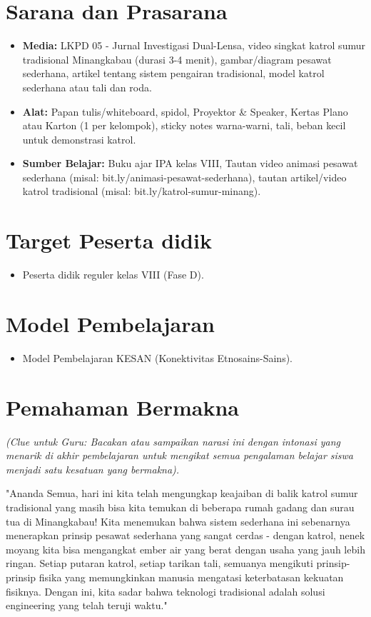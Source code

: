 \documentclass[a4paper,12pt]{article}
\begin{document}
\section{Sarana dan Prasarana}

\begin{itemize}
\item \textbf{Media:} LKPD 05 - Jurnal Investigasi Dual-Lensa, video singkat katrol sumur tradisional Minangkabau (durasi 3-4 menit), gambar/diagram pesawat sederhana, artikel tentang sistem pengairan tradisional, model katrol sederhana atau tali dan roda.
\item \textbf{Alat:} Papan tulis/whiteboard, spidol, Proyektor \& Speaker, Kertas Plano atau Karton (1 per kelompok), sticky notes warna-warni, tali, beban kecil untuk demonstrasi katrol.
\item \textbf{Sumber Belajar:} Buku ajar IPA kelas VIII, Tautan video animasi pesawat sederhana (misal: bit.ly/animasi-pesawat-sederhana), tautan artikel/video katrol tradisional (misal: bit.ly/katrol-sumur-minang).
\end{itemize}

\section{Target Peserta didik}

\begin{itemize}
\item Peserta didik reguler kelas VIII (Fase D).
\end{itemize}

\section{Model Pembelajaran}

\begin{itemize}
\item Model Pembelajaran KESAN (Konektivitas Etnosains-Sains).
\end{itemize}

\section{Pemahaman Bermakna}
\textit{(Clue untuk Guru: Bacakan atau sampaikan narasi ini dengan intonasi yang menarik di akhir pembelajaran untuk mengikat semua pengalaman belajar siswa menjadi satu kesatuan yang bermakna).}

\begin{tcolorbox}[sectionbox]
"Ananda Semua, hari ini kita telah mengungkap keajaiban di balik katrol sumur tradisional yang masih bisa kita temukan di beberapa rumah gadang dan surau tua di Minangkabau! Kita menemukan bahwa sistem sederhana ini sebenarnya menerapkan prinsip pesawat sederhana yang sangat cerdas - dengan katrol, nenek moyang kita bisa mengangkat ember air yang berat dengan usaha yang jauh lebih ringan. Setiap putaran katrol, setiap tarikan tali, semuanya mengikuti prinsip-prinsip fisika yang memungkinkan manusia mengatasi keterbatasan kekuatan fisiknya. Dengan ini, kita sadar bahwa teknologi tradisional adalah solusi engineering yang telah teruji waktu."
\end{tcolorbox}
\end{document}
